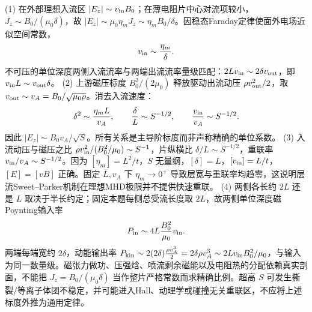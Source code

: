 (1) 在外部理想入流区 \(|E_z|\sim v_{\rm in}B_0\)；在薄电阻片中心对流项较小，\(J_z\sim B_0/(\mu_0\delta)\)，故 \(|E_z|\sim \mu_0\eta_mJ_z\sim\eta_mB_0/\delta\)。因稳态Faraday定律使面外电场近似空间常数，
\[
v_{\rm in}\sim\frac{\eta_m}{\delta}.
\]
不可压的单位深度两侧入流流率与两端出流流率量级匹配：\(2L v_{\rm in}\sim2\delta v_{\rm out}\)，即 \(v_{\rm in}L\sim v_{\rm out}\delta\)。
(2) 上游磁压标度 \(B_0^2/(2\mu_0)\) 释放驱动出流动压 \(\rho v_{\rm out}^2/2\)，取 \(v_{\rm out}\sim v_A=B_0/\sqrt{\mu_0\rho}\)。消去入流速度：
\[
\delta^2\sim\frac{\eta_m L}{v_A},\qquad
\frac{\delta}{L}\sim S^{-1/2},\qquad
\frac{v_{\rm in}}{v_A}\sim S^{-1/2}.
\]
因此 \(|E_z|\sim B_0v_A/\sqrt S\)。所有关系是主导阶标度而非声称精确的单位系数。
(3) 入流动压与磁压之比 \(\rho v_{\rm in}^2/(B_0^2/\mu_0)\sim S^{-1}\)，片纵横比 \(\delta/L\sim S^{-1/2}\)，重联率 \(v_{\rm in}/v_A\sim S^{-1/2}\)。因为 \([\eta_m]=L^2/t\)，\(S\) 无量纲，\([\delta]=L\)，\([v_{\rm in}]=L/t\)，\([E]=[vB]\) 正确。固定 \(L,v_A\) 下 \(\eta_m\to0^+\) 导致层宽与重联率均趋零，这说明层流Sweet--Parker机制在理想MHD极限并不提供快速重联。
(4) 两侧各长约 \(2L\) 还是 \(L\) 取决于半长约定；固定本题每侧总受流长度取 \(2L\)，故两侧单位深度磁Poynting输入率
\[
P_{\rm in}\sim4L\frac{B_0^2}{\mu_0}v_{\rm in}.
\]
两端每端宽约 \(2\delta\)，动能输出率
\(P_{\rm kin}\sim2(2\delta)\frac{\rho v_A^3}{2}=2\delta\rho v_A^3\sim2Lv_{\rm in}B_0^2/\mu_0\)，与输入为同一数量级。磁张力做功、压强焓、喷流剩余磁能以及电阻热的分配依赖真实剖面，不能把 \(J_z=B_0/(\mu_0\delta)\) 当作整片严格常数而求精确比例。超高 \(S\) 可发生撕裂/等离子体团不稳定，并可能进入Hall、动理学或碰撞无关重联区，不应将上述标度外推为通用定律。
